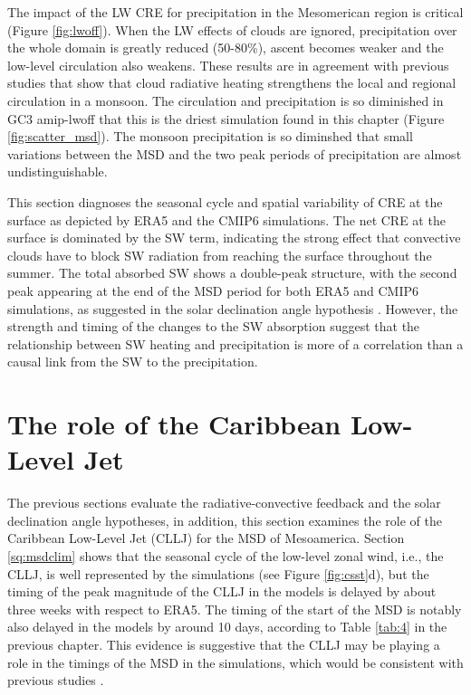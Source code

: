 The impact of the LW CRE for precipitation in the Mesomerican region is critical (Figure \ref{fig:lwoff}). When the LW effects of clouds are ignored, precipitation over the whole domain is greatly reduced (50-80\%), ascent becomes weaker and the low-level circulation also weakens. 
These results are in agreement with previous studies \citep{guo2015,byrne2020} that show that cloud radiative heating strengthens the local and regional circulation in a monsoon. The circulation and precipitation is so diminished in GC3 amip-lwoff that this is the driest simulation found in this chapter (Figure \ref{fig:scatter_msd}). The monsoon precipitation is so diminshed that small variations between the MSD and the two peak periods of precipitation are almost undistinguishable. 

This section diagnoses the seasonal cycle and spatial variability of CRE at the surface as depicted by ERA5 and the CMIP6 simulations. The net CRE at the surface is dominated by the SW term, indicating the strong effect that convective clouds have to block SW radiation from reaching the surface throughout the summer. The total absorbed SW shows a double-peak structure, with the second peak appearing at the end of the MSD period for both ERA5 and CMIP6 simulations, as suggested in the solar declination angle hypothesis \cite{karnauskas2013}. However, the strength and timing of the changes to the SW absorption suggest that the relationship between SW heating and precipitation is more of a correlation than a causal link from the SW to the precipitation. 

\section{The role of the Caribbean Low-Level Jet}

The previous sections evaluate the radiative-convective feedback and the solar declination angle hypotheses, in addition, this section examines the role of the Caribbean Low-Level Jet (CLLJ) for the MSD of Mesoamerica. Section \ref{sq:msdclim} shows that the seasonal cycle of the low-level zonal wind, i.e., the CLLJ, is well represented by the simulations (see Figure \ref{fig:csst}d), but the timing of the peak magnitude of the CLLJ in the models is delayed by about three weeks with respect to ERA5. The timing of the start of the MSD is notably also delayed in the models by around 10 days, according to Table \ref{tab:4} in the previous chapter. This evidence is suggestive that the CLLJ may be playing a role in the timings of the MSD in the simulations, which would be consistent with previous studies \citep[e.g.][]{herrera2015,martinez2019}.


